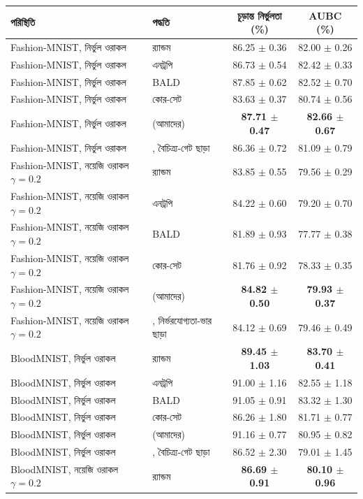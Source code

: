 \begin{tabular}{llcc}
\toprule
পরিস্থিতি & পদ্ধতি & চূড়ান্ত নির্ভুলতা (\%) & AUBC (\%) \\
\midrule
Fashion-MNIST, নির্ভুল ওরাকল & র‍্যান্ডম & 86.25 $\pm$ 0.36 & 82.00 $\pm$ 0.26 \\
Fashion-MNIST, নির্ভুল ওরাকল & এনট্রপি & 86.73 $\pm$ 0.54 & 82.42 $\pm$ 0.33 \\
Fashion-MNIST, নির্ভুল ওরাকল & BALD & 87.85 $\pm$ 0.62 & 82.52 $\pm$ 0.70 \\
Fashion-MNIST, নির্ভুল ওরাকল & কোর-সেট & 83.63 $\pm$ 0.37 & 80.74 $\pm$ 0.56 \\
Fashion-MNIST, নির্ভুল ওরাকল & \method{} (আমাদের) & \textbf{87.71 $\pm$ 0.47} & \textbf{82.66 $\pm$ 0.67} \\
Fashion-MNIST, নির্ভুল ওরাকল & \method{}, বৈচিত্র্য-গেট ছাড়া & 86.36 $\pm$ 0.72 & 81.09 $\pm$ 0.79 \\
\midrule
Fashion-MNIST, নয়েজি ওরাকল $\gamma{=}0.2$ & র‍্যান্ডম & 83.85 $\pm$ 0.55 & 79.56 $\pm$ 0.29 \\
Fashion-MNIST, নয়েজি ওরাকল $\gamma{=}0.2$ & এনট্রপি & 84.22 $\pm$ 0.60 & 79.20 $\pm$ 0.70 \\
Fashion-MNIST, নয়েজি ওরাকল $\gamma{=}0.2$ & BALD & 81.89 $\pm$ 0.93 & 77.77 $\pm$ 0.38 \\
Fashion-MNIST, নয়েজি ওরাকল $\gamma{=}0.2$ & কোর-সেট & 81.76 $\pm$ 0.92 & 78.33 $\pm$ 0.35 \\
Fashion-MNIST, নয়েজি ওরাকল $\gamma{=}0.2$ & \method{} (আমাদের) & \textbf{84.82 $\pm$ 0.50} & \textbf{79.93 $\pm$ 0.37} \\
Fashion-MNIST, নয়েজি ওরাকল $\gamma{=}0.2$ & \method{}, নির্ভরযোগ্যতা-ভার ছাড়া & 84.12 $\pm$ 0.69 & 79.46 $\pm$ 0.49 \\
\midrule
BloodMNIST, নির্ভুল ওরাকল & র‍্যান্ডম & \textbf{89.45 $\pm$ 1.03} & \textbf{83.70 $\pm$ 0.41} \\
BloodMNIST, নির্ভুল ওরাকল & এনট্রপি & 91.00 $\pm$ 1.16 & 82.55 $\pm$ 1.18 \\
BloodMNIST, নির্ভুল ওরাকল & BALD & 91.05 $\pm$ 0.91 & 83.32 $\pm$ 1.30 \\
BloodMNIST, নির্ভুল ওরাকল & কোর-সেট & 86.26 $\pm$ 1.80 & 81.71 $\pm$ 0.77 \\
BloodMNIST, নির্ভুল ওরাকল & \method{} (আমাদের) & 91.16 $\pm$ 0.77 & 80.95 $\pm$ 0.82 \\
BloodMNIST, নির্ভুল ওরাকল & \method{}, বৈচিত্র্য-গেট ছাড়া & 86.52 $\pm$ 2.30 & 79.01 $\pm$ 1.45 \\
\midrule
BloodMNIST, নয়েজি ওরাকল $\gamma{=}0.2$ & র‍্যান্ডম & \textbf{86.69 $\pm$ 0.91} & \textbf{80.10 $\pm$ 0.96} \\

\end{tabular}
